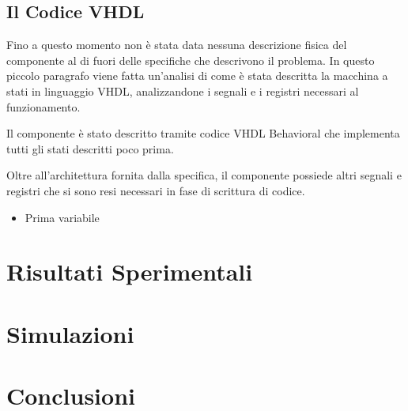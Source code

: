 \documentclass{article}
\begin{document}
\subsection{Il Codice VHDL}

Fino a questo momento non è stata data nessuna descrizione fisica del componente al di fuori delle specifiche che descrivono il problema. In questo piccolo paragrafo viene fatta un'analisi di come è stata descritta la macchina a stati in linguaggio VHDL, analizzandone i segnali e i registri necessari al funzionamento.

Il componente è stato descritto tramite codice VHDL Behavioral che implementa tutti gli stati descritti poco prima. %

 Oltre all'architettura fornita dalla specifica, il componente possiede altri segnali e registri che si sono resi necessari in fase di scrittura di codice.



\begin{itemize}

\item Prima variabile
\end{itemize}



\section{Risultati Sperimentali}

\section{Simulazioni}

\section{Conclusioni}
\end{document}
